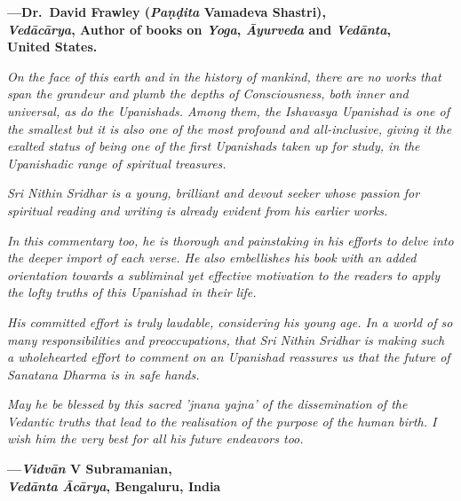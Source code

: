 \begin{flushright}
\textbf{---Dr.\ David Frawley (\emph{Paṇḍita} Vamadeva Shastri),}\\
\textbf{\emph{Vedācārya}, Author of books on \emph{Yoga}, \emph{Āyurveda} and \emph{Vedānta},}\\
\textbf{United States.}
\end{flushright}
\medskip


\emph{On the face of this earth and in the history of mankind, there are no works that span the grandeur and plumb the depths of Consciousness, both inner and universal, as do the Upanishads. Among them, the Ishavasya Upanishad is one of the smallest but it is also one of the most profound and all-inclusive, giving it the exalted status of being one of the first Upanishads taken up for study, in the Upanishadic range of spiritual treasures.}

\emph{Sri Nithin Sridhar is a young, brilliant and devout seeker whose passion for spiritual reading and writing is already evident from his earlier works.}

\emph{In this commentary too, he is thorough and painstaking in his efforts to delve into the deeper import of each verse. He also embellishes his book with an added orientation towards a subliminal yet effective motivation to the readers to apply the lofty truths of this Upanishad in their life.}

\emph{His committed effort is truly laudable, considering his young age. In a world of so many responsibilities and preoccupations, that Sri Nithin Sridhar is making such a wholehearted effort to comment on an Upanishad reassures us that the future of Sanatana Dharma is in safe hands.}

\emph{May he be blessed by this sacred 'jnana yajna' of the dissemination of the Vedantic truths that lead to the realisation of the purpose of the human birth. I wish him the very best for all his future endeavors too.}
\medskip

\begin{flushright}
\textbf{---\emph{Vidvān} V Subramanian,}\\
\textbf{\emph{Vedānta} \emph{Ācārya}, Bengaluru, India}
\end{flushright}

